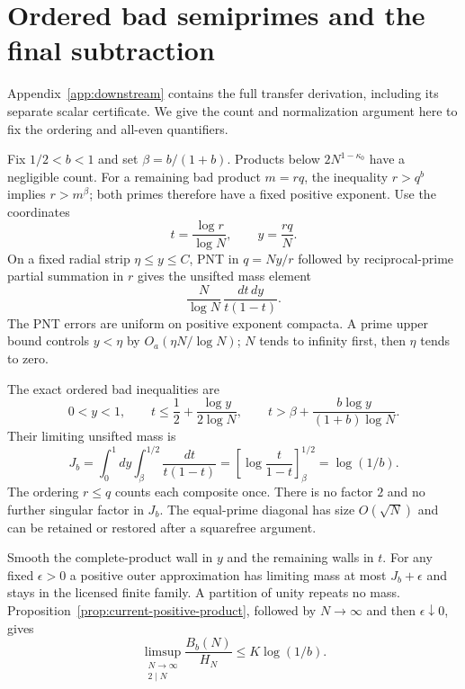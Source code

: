 \section{Ordered bad semiprimes and the final subtraction}
\label{sec:current-transfer}

Appendix~\ref{app:downstream} contains the full transfer derivation,
including its separate scalar certificate.  We give the count and
normalization argument here to fix the ordering and all-even quantifiers.

Fix $1/2<b<1$ and set $\beta=b/(1+b)$.  Products below
$2N^{1-\kappa_0}$ have a negligible count.  For a remaining bad
product $m=rq$, the inequality $r>q^b$ implies $r>m^\beta$;
both primes therefore have a fixed positive exponent.  Use the
coordinates
\[
                       t=\frac{\log r}{\log N},\qquad y=\frac{rq}{N}.
\]
On a fixed radial strip $\eta\le y\le C$, PNT in $q=Ny/r$
followed by reciprocal-prime partial summation in $r$ gives the
unsifted mass element
\begin{equation}
                         \frac{N}{\log N}\,
                              \frac{dt\,dy}{t(1-t)}.
 \label{eq:current-pair-measure}
\end{equation}
The PNT errors are uniform on positive exponent compacta.  A prime
upper bound controls $y<\eta$ by $O_a(\eta N/\log N)$; $N$ tends
to infinity first, then $\eta$ tends to zero.

The exact ordered bad inequalities are
\[
 0<y<1,\qquad
 t\le\frac12+\frac{\log y}{2\log N},\qquad
 t>\beta+\frac{b\log y}{(1+b)\log N}.
\]
Their limiting unsifted mass is
\begin{equation}
 J_b=\int_0^1dy\int_\beta^{1/2}\frac{dt}{t(1-t)}
     =\left[\log\frac{t}{1-t}\right]_\beta^{1/2}
     =\log(1/b).
 \label{eq:current-bad-mass}
\end{equation}
The ordering $r\le q$ counts each composite once.  There is no
factor $2$ and no further singular factor in $J_b$.  The
equal-prime diagonal has size $O(\sqrt N)$ and can be retained or
restored after a squarefree argument.

Smooth the complete-product wall in $y$ and the remaining walls
in $t$.  For any fixed $\epsilon>0$ a positive outer approximation
has limiting mass at most $J_b+\epsilon$ and stays in the licensed
finite family.  A partition of unity repeats no mass.
Proposition~\ref{prop:current-positive-product}, followed by
$N\to\infty$ and then $\epsilon\downarrow0$, gives
\begin{equation}
 \limsup_{\substack{N\to\infty\\2\mid N}}
             \frac{B_b(N)}{H_N}\le K\log(1/b).
 \label{eq:current-bad-bound}
\end{equation}

